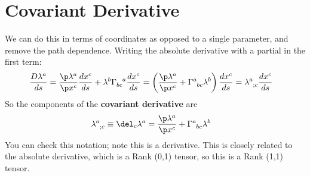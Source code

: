 \documentclass[a4paper, 11pt, normalem]{report}
\begin{document}
\section{Covariant Derivative}
We can do this in terms of coordinates as opposed to a single parameter, and remove the path dependence. 
Writing the absolute derivative with a partial in the first term:
\begin{align}
    \frac{D\lambda^a}{ds} &= \frac{\p\lambda^a}{\p x^c}\frac{dx^c}{ds} + \lambda^b\tensor{\Gamma}{_{bc}^a}\frac{dx^c}{ds} = \left(\frac{\p\lambda^a}{\p x^c} + \tensor{\Gamma}{^a_{bc}}\lambda^b\right)\frac{dx^c}{ds} = \tensor{\lambda}{^a_{;c}}\frac{dx^c}{ds}
\end{align}
So the components of the \textbf{covariant derivative} are
\begin{align}
    \tensor{\lambda}{^a_{;c}} &\equiv \del_c\lambda^a = \frac{\p\lambda^a}{\p x^c}+\tensor{\Gamma}{^a_{bc}}\lambda^b
\end{align}
You can check this notation; note this is a derivative. 
This is closely related to the absolute derivative, which is a Rank (0,1) tensor, so this is a Rank (1,1) tensor. 
\end{document}
